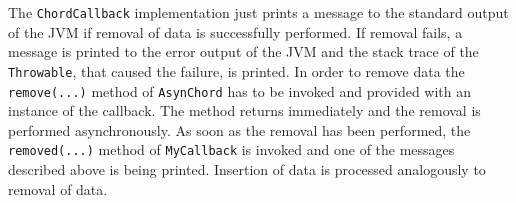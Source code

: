 
The {\tt ChordCallback} implementation just prints a message to the standard output 
of the JVM if removal of data is successfully performed. If removal fails, a message 
is printed to the error output of the JVM and the stack trace of the {\tt Throwable}, 
that caused the failure, is printed. In order to remove data the {\tt remove(...)} 
method of {\tt AsynChord} has to be invoked and provided with an instance of the 
callback. The method returns immediately and the removal is performed asynchronously. 
As soon as the removal has been performed, the {\tt removed(...)} method of 
{\tt MyCallback} is invoked and one of the messages described above is being printed. 
Insertion of data is processed analogously to removal of data. 

